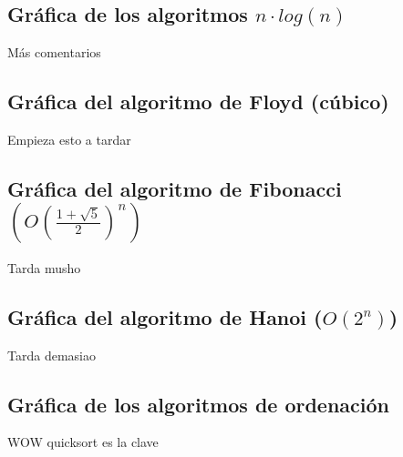 \documentclass[a4paper, 11pt]{article}
\begin{document}
\subsection{Gráfica de los algoritmos $n\cdot log(n)$ }
Más comentarios 

\subsection{Gráfica del algoritmo de Floyd (cúbico)}
Empieza esto a tardar

\subsection{Gráfica del algoritmo de Fibonacci $(O(\frac{1+\sqrt{5}}{2})^n)$}

Tarda musho

\subsection{Gráfica del algoritmo de Hanoi ($O(2^n)$)}

Tarda demasiao


\subsection{Gráfica de los algoritmos de ordenación}

WOW quicksort es la clave
\end{document}
